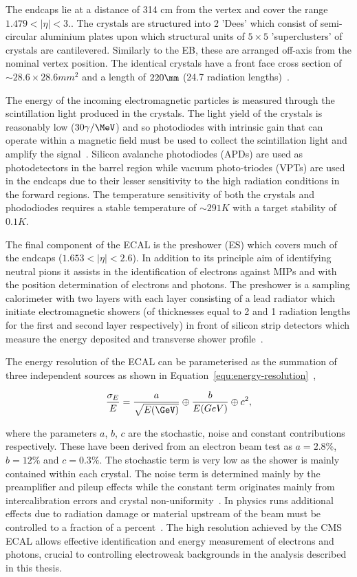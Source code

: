 The endcaps lie at a distance of 314 cm from the vertex and cover the range $1.479 < |\eta| < 3.$. The crystals
are structured into 2 'Dees' which consist of semi-circular aluminium plates upon which structural units of 
$5\times5$ 'superclusters' of crystals are cantilevered. Similarly to the EB, these are arranged off-axis from
the nominal vertex position. The identical crystals have a front face cross section of 
$\sim 28.6\times28.6 mm^2$ and a length of $220\mm$ (24.7 radiation lengths)~\cite{CMS}.

The energy of the incoming electromagnetic particles is measured through the scintillation light produced
in the crystals. The light yield of the crystals is reasonably low ($30\gamma/\MeV$)
and so photodiodes with intrinsic gain that can operate within a magnetic field must be used to collect 
the scintillation light and amplify the signal~\cite{ecal_tdr}. Silicon avalanche photodiodes (APDs) are used as photodetectors
in the barrel region while vacuum photo-triodes (VPTs) are used in the endcaps due to their lesser sensitivity
to the high radiation conditions in the forward regions. The temperature sensitivity of both the crystals 
and phododiodes requires a stable temperature of $\sim291K$ with a target stability of $0.1K$. 

The final component of the ECAL is the preshower (ES) which covers much of the endcaps ($1.653 < |\eta| < 2.6$). In addition
to its principle aim of identifying neutral pions it assists in the identification of electrons against MIPs and with
the position determination of electrons and photons. The preshower is a sampling calorimeter with two layers with each layer
consisting of a lead radiator which initiate electromagnetic showers (of thicknesses equal to 2 and 1 radiation lengths for the 
first and second layer respectively) in front of silicon strip detectors which 
measure the energy deposited and transverse shower profile~\cite{ecal_tdr}.  

The energy resolution of the ECAL can be parameterised as the summation of three independent sources as shown 
in Equation~\ref{equ:energy-resolution}~\cite{ecal_performance2},

\begin{equation}
\frac{\sigma_E}{E} = \frac{a}{\sqrt{E(\GeV)}} \oplus \frac{b}{E(GeV)} \oplus c^2,
\label{equ:energy-resolution}
\end{equation}

where the parameters $a$, $b$, $c$ are the stochastic, noise and constant contributions respectively. These have been
derived from an electron beam test as $a=2.8\%$, $b=12\%$ and $c=0.3\%$. The stochastic
term is very low as the shower is mainly contained within each crystal. The noise term is determined mainly by 
the preamplifier and pileup effects while the constant term originates mainly from intercalibration errors and crystal non-uniformity~\cite{ecal_tdr}. 
In physics runs additional effects due to radiation damage or material upstream of the beam must be controlled to a 
fraction of a percent~\cite{ecal_performance}. The high resolution achieved by the CMS ECAL allows effective identification and energy measurement of electrons and photons, crucial to
controlling electroweak backgrounds in the analysis described in this thesis.

